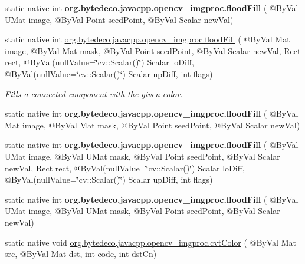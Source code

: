 \begin{DoxyCompactItemize}
\item 
\mbox{\label{group__imgproc__misc_gab28f9dea8929d8066aeb22f5fc51a06a}} 
static native int {\bfseries org.\+bytedeco.\+javacpp.\+opencv\+\_\+imgproc.\+flood\+Fill} ( @By\+Val U\+Mat image, @By\+Val Point seed\+Point, @By\+Val Scalar new\+Val)
\item 
static native int \hyperlink{group__imgproc__misc_gae1a712c481241605487f34e3b969f49c}{org.\+bytedeco.\+javacpp.\+opencv\+\_\+imgproc.\+flood\+Fill} ( @By\+Val Mat image, @By\+Val Mat mask, @By\+Val Point seed\+Point, @By\+Val Scalar new\+Val, Rect rect, @By\+Val(null\+Value=\char`\"{}cv\+::\+Scalar()\char`\"{}) Scalar lo\+Diff, @By\+Val(null\+Value=\char`\"{}cv\+::\+Scalar()\char`\"{}) Scalar up\+Diff, int flags)
\begin{DoxyCompactList}\small\item\em Fills a connected component with the given color. \end{DoxyCompactList}\item 
\mbox{\label{group__imgproc__misc_ga6bf5568d753264734416bfaac546dfc1}} 
static native int {\bfseries org.\+bytedeco.\+javacpp.\+opencv\+\_\+imgproc.\+flood\+Fill} ( @By\+Val Mat image, @By\+Val Mat mask, @By\+Val Point seed\+Point, @By\+Val Scalar new\+Val)
\item 
\mbox{\label{group__imgproc__misc_gae7e1b6b5e7d7b4f49431d284f3bbba28}} 
static native int {\bfseries org.\+bytedeco.\+javacpp.\+opencv\+\_\+imgproc.\+flood\+Fill} ( @By\+Val U\+Mat image, @By\+Val U\+Mat mask, @By\+Val Point seed\+Point, @By\+Val Scalar new\+Val, Rect rect, @By\+Val(null\+Value=\char`\"{}cv\+::\+Scalar()\char`\"{}) Scalar lo\+Diff, @By\+Val(null\+Value=\char`\"{}cv\+::\+Scalar()\char`\"{}) Scalar up\+Diff, int flags)
\item 
\mbox{\label{group__imgproc__misc_ga8b349da3adc83b3f06185c02aa4e767f}} 
static native int {\bfseries org.\+bytedeco.\+javacpp.\+opencv\+\_\+imgproc.\+flood\+Fill} ( @By\+Val U\+Mat image, @By\+Val U\+Mat mask, @By\+Val Point seed\+Point, @By\+Val Scalar new\+Val)
\item 
static native void \hyperlink{group__imgproc__misc_gaab99985581c43cce9df680e6586cb9ef}{org.\+bytedeco.\+javacpp.\+opencv\+\_\+imgproc.\+cvt\+Color} ( @By\+Val Mat src, @By\+Val Mat dst, int code, int dst\+Cn)

\end{DoxyCompactItemize}
